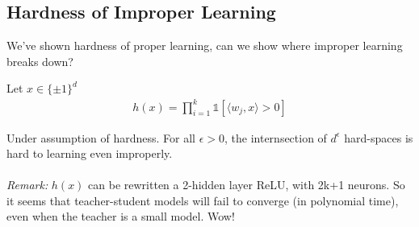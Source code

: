 \subsection{Hardness of Improper Learning}
We've shown hardness of proper learning, can we show where improper learning breaks down?
\begin{definition}
	 Let $x \in \{\pm 1\}^d$
	\begin{align}
		h(x) = \prod_{i=1}^k \mathds 1[\langle w_j, x\rangle > 0]
	\end{align}
\end{definition}
Under assumption of hardness. For all $\epsilon > 0$, the internsection of $d^\epsilon$ hard-spaces is hard to learning even improperly.\\
\\
\emph{Remark:} $h(x)$ can be rewritten a 2-hidden layer ReLU, with 2k+1 neurons. So it seems that teacher-student models will fail to converge (in polynomial time), even when the teacher is a small model. Wow!


